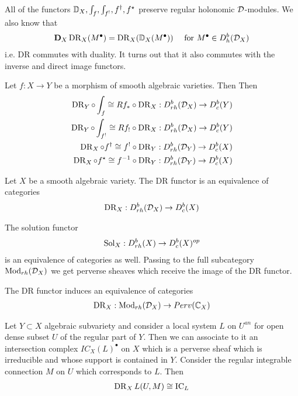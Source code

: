 All of the functors $\mathbb{D}_X,\int_f,\int_{f^!},f^\dagger,f^\star$ preserve regular holonomic ${\mathcal{D}}$-modules.
We also know that \begin{align*}
    \textbf{D}_X \operatorname{DR}_X(M^\bullet) = \operatorname{DR}_X(\mathbb{D}_X(M^\bullet)) \quad \text{ for } M^\bullet \in D^b_{h}({\mathcal{D}}_X)
\end{align*}
i.e. DR commutes with duality. It turns out that it also commutes with the inverse and 
direct image functors. 

\begin{theorem}
    Let $f:X\to Y$ be a morphism of smooth algebraic varieties. Then
    Then \begin{align*}
        \operatorname{DR}_Y \circ \int_f \cong Rf_* \circ \operatorname{DR}_X:D^b_{rh}({\mathcal{D}}_X) \to D^b_{c}(Y) \\
        \operatorname{DR}_Y \circ \int_{f^!} \cong Rf_! \circ \operatorname{DR}_X:D^b_{rh}({\mathcal{D}}_X) \to D^b_{c}(Y) \\
        \operatorname{DR}_X \circ f^\dagger \cong f^! \circ \operatorname{DR}_Y:D^b_{rh}({\mathcal{D}}_Y) \to D^b_{c}(X) \\
        \operatorname{DR}_X \circ f^\star \cong f^{-1} \circ \operatorname{DR}_Y:D^b_{rh}({\mathcal{D}}_Y) \to D^b_{c}(X)
    \end{align*}
\end{theorem}

\begin{theorem}
     Let $X$ be a smooth algebraic variety.
    The DR functor is an equivalence of categories \begin{align*}
        \operatorname{DR}_X:D^b_{rh}({\mathcal{D}}_X) \to D^b_c(X)
    \end{align*}
\end{theorem}
The solution functor \begin{align*}
    \operatorname{Sol}_X:D^b_{rh}(X) \to D^b_c(X)^{op}
\end{align*} is an equivalence of categories as well.
Passing to the full subcategory $\operatorname{Mod}_{rh}({\mathcal{D}}_X)$ we get 
perverse sheaves which receive the image of the DR functor.

\begin{theorem}
    The DR functor induces an equivalence of categories \begin{align*}
        \operatorname{DR}_X:\operatorname{Mod}_{rh}({\mathcal{D}}_X) \to Perv(\mathbb{C}_X)
    \end{align*}
\end{theorem}

\begin{remark}
    Let $Y \subset X$ algebraic subvariety and consider a local 
    system $L$ on $U^{an}$ for open dense subset $U$ of the 
    regular part of $Y$. Then 
    we can associate to it an intersection complex $IC_X(L)^{\bullet}$
    on $X$ which is a perverse sheaf which is irreducible and whose
    support is contained in $Y$. Consider the regular integrable 
    connection $M$ on $U$ which corresponds to $L$.
    Then \begin{align*}
        \operatorname{DR}_X L(U,M) \cong \operatorname{IC}_L
    \end{align*}
\end{remark}



